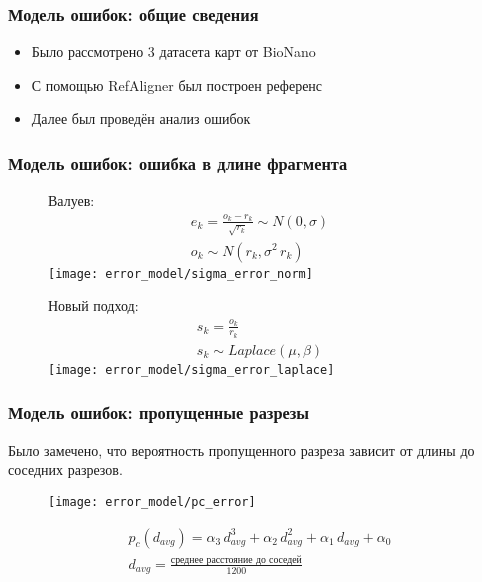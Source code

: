 \begin{frame}
\frametitle{Модель ошибок: общие сведения}
\begin{itemize}
  \item Было рассмотрено 3 датасета карт от BioNano
  \item С помощью RefAligner был построен референс
  \item Далее был проведён анализ ошибок
\end{itemize}
\end{frame}

\begin{frame}
\frametitle{Модель ошибок: ошибка в длине фрагмента}


\begin{figure}
\centering
\begin{minipage}{.5\textwidth}
  Валуев:
  \begin{gather*}
  e_k = \frac{o_k - r_k}{\sqrt{r_k}} \sim N(0, \sigma) \\
  o_k \sim N(r_k, \sigma^2 \, r_k)
  \end{gather*}
  \centering
  \texttt{[image: error\_model/sigma\_error\_norm]}
\end{minipage}%
\begin{minipage}{.5\textwidth}
  Новый подход:
  \begin{gather*}
  s_k = \frac{o_k}{r_k} \\
  s_k \sim Laplace(\mu, \beta)
  \end{gather*}
  \centering
  \texttt{[image: error\_model/sigma\_error\_laplace]}
\end{minipage}
\end{figure}
\end{frame}

\begin{frame}
\frametitle{Модель ошибок: пропущенные разрезы}
Было замечено, что вероятность пропущенного разреза зависит от длины до соседних разрезов.
\begin{figure}
  \centering
  \texttt{[image: error\_model/pc\_error]}
\end{figure}
\begin{gather*}
p_c (d_{avg}) = \alpha_3 \, d_{avg}^3 + \alpha_2 \, d_{avg}^2 +  \alpha_1 \, d_{avg} + \alpha_0 \\
d_{avg} = \frac{\text{среднее расстояние до соседей}}{1200}
\end{gather*}
\end{frame}

